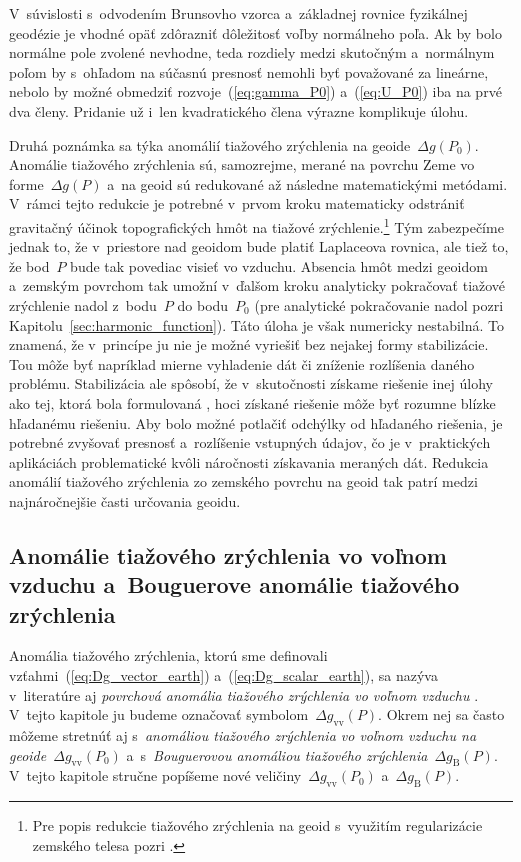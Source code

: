 \documentclass[a4paper, 12pt]{book}
\begin{document}
V~súvislosti s~odvodením Brunsovho vzorca a~základnej rovnice fyzikálnej 
geodézie je vhodné opäť zdôrazniť dôležitosť voľby normálneho poľa.  Ak by bolo 
normálne pole zvolené nevhodne, teda rozdiely medzi skutočným a~normálnym poľom 
by s~ohľadom na súčasnú presnosť nemohli byť považované za lineárne, nebolo by 
možné obmedziť rozvoje~(\ref{eq:gamma_P0}) a~(\ref{eq:U_P0}) iba na prvé dva 
členy.  Pridanie už i~len kvadratického člena výrazne komplikuje úlohu.

Druhá poznámka sa týka anomálií tiažového zrýchlenia na geoide~$\Delta g(P_0)$.  
Anomálie tiažového zrýchlenia sú, samozrejme, merané na povrchu Zeme vo 
forme~$\Delta g(P)$ a~na geoid sú redukované až následne matematickými 
metódami.  V~rámci tejto redukcie je potrebné v~prvom kroku matematicky 
odstrániť gravitačný účinok topografických hmôt na tiažové 
zrýchlenie.\footnote{Pre popis redukcie tiažového zrýchlenia na geoid 
s~využitím regularizácie zemského telesa pozri \textcite{Janak2006}.}  Tým 
zabezpečíme jednak to, že v~priestore nad geoidom bude platiť Laplaceova 
rovnica, ale tiež to, že bod~$P$ bude tak povediac visieť vo vzduchu.  Absencia 
hmôt medzi geoidom a~zemským povrchom tak umožní v~ďalšom kroku analyticky 
pokračovať tiažové zrýchlenie nadol z~bodu~$P$ do bodu~$P_0$ (pre analytické 
pokračovanie nadol pozri Kapitolu~\ref{sec:harmonic_function}).  Táto úloha je 
však numericky nestabilná.  To znamená, že v~princípe ju nie je možné vyriešiť 
bez nejakej formy stabilizácie.  Tou môže byť napríklad mierne vyhladenie dát 
či zníženie rozlíšenia daného problému.  Stabilizácia ale spôsobí, že 
v~skutočnosti získame riešenie inej úlohy ako tej, ktorá bola formulovaná 
\parencite{SansoGeodeticBoundaryValueProblem}, hoci získané riešenie môže byť 
rozumne blízke hľadanému riešeniu.  Aby bolo možné potlačiť odchýlky od 
hľadaného riešenia, je potrebné zvyšovať presnosť a~rozlíšenie vstupných 
údajov, čo je v~praktických aplikáciách problematické kvôli náročnosti 
získavania meraných dát.  Redukcia anomálií tiažového zrýchlenia zo zemského 
povrchu na geoid tak patrí medzi najnáročnejšie časti určovania geoidu.





\subsection{Anomálie tiažového zrýchlenia vo voľnom vzduchu a~Bouguerove 
anomálie tiažového zrýchlenia}

Anomália tiažového zrýchlenia, ktorú sme definovali 
vzťahmi~(\ref{eq:Dg_vector_earth}) a~(\ref{eq:Dg_scalar_earth}), sa nazýva 
v~literatúre aj \emph{povrchová anomália tiažového zrýchlenia vo voľnom 
vzduchu} \parencite{SansoGeoidDetermination}.  V~tejto kapitole ju budeme 
označovať symbolom~$\Delta g_{\mathrm{vv}}(P)$.  Okrem nej sa často môžeme 
stretnúť aj s~\emph{anomáliou tiažového zrýchlenia vo voľnom vzduchu na 
geoide}~$\Delta g_{\mathrm{vv}}(P_0)$ a~s~\emph{Bouguerovou anomáliou tiažového 
zrýchlenia}~$\Delta g_{\mathrm{B}}(P)$.  V~tejto kapitole stručne popíšeme nové 
veličiny~$\Delta g_{\mathrm{vv}}(P_0)$ a~$\Delta g_{\mathrm{B}}(P)$.
\end{document}
